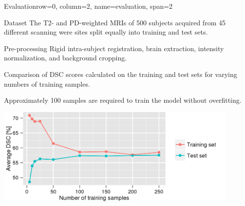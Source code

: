\documentclass[%
portrait,paperwidth=841mm,paperheight=1180mm,%
margin=2cm,
fontscale=0.32
]{baposter}
\begin{document}
\begin{poster}
\begin{headerblock}{Evaluation}{row=0, column=2, name=evaluation, span=2}
\begin{compactdesc}
\item[Dataset] The T2- and PD-weighted MRIs of 500 subjects acquired from 45
different scanning were sites split equally into training and test sets.
\item[Pre-processing] Rigid intra-subject registration, brain extraction,
intensity normalization, and background cropping.
\end{compactdesc}
\begin{compactitem}
\item Comparison of DSC scores calculated on the training and test sets for
varying numbers of training samples.
\item Approximately 100 samples are required to train the model without
overfitting.
\end{compactitem}
\begin{center}
\includegraphics[width=0.9\textwidth]{figures/train_count}
\end{center}
\end{headerblock}






\end{poster}
\end{document}
